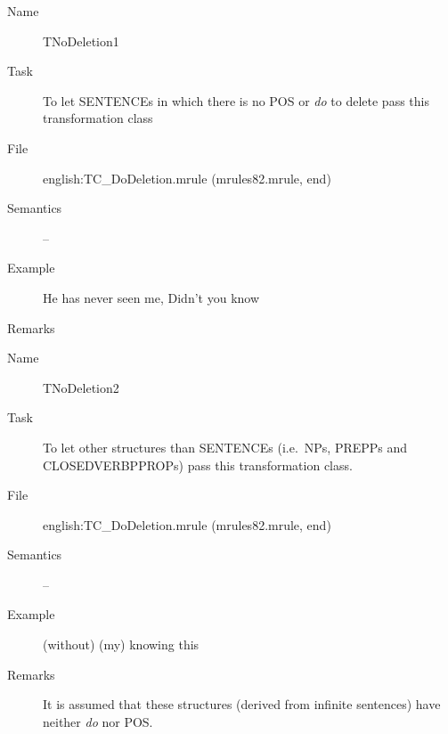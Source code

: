\begin{description}
\vspace{1 cm}
\begin{description}
\item[Name] TNoDeletion1
\item[Task] To let SENTENCEs in which there is no POS or {\em do\/} to delete 
pass this transformation class
\item[File] english:TC\_DoDeletion.mrule (mrules82.mrule, end)
\item[Semantics] --
\item[Example] He has never seen me, Didn't you know
\item[Remarks]
\end{description}

\vspace{1 cm}
\begin{description}
\item[Name] TNoDeletion2
\item[Task] To let other structures than SENTENCEs (i.e.\ NPs, PREPPs and 
CLOSEDVERBPPROPs) pass this transformation class.
\item[File] english:TC\_DoDeletion.mrule (mrules82.mrule, end)
\item[Semantics] --
\item[Example] (without) (my) knowing this
\item[Remarks] It is assumed that these structures (derived from infinite 
sentences) have neither {\em do\/} nor POS.
\end{description}

\end{description}

\newpage
